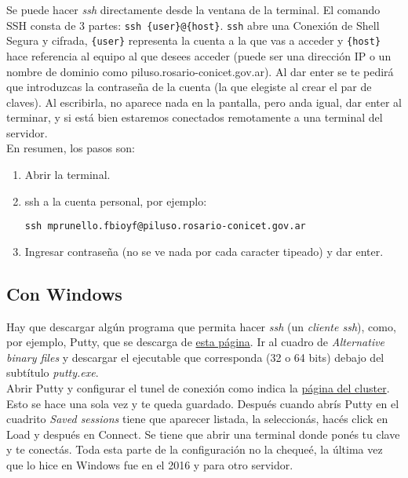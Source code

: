 \documentclass[paper=a4, fontsize=11pt]{scrartcl} %
\numberwithin{equation}{section} %
\numberwithin{figure}{section} %
\numberwithin{table}{section} %
\begin{document}
Se puede hacer \textit{ssh} directamente desde la ventana de la terminal. El comando SSH consta de 3 partes: \texttt{ssh \{user\}@\{host\}}. \texttt{ssh} abre una Conexión de Shell Segura y cifrada, \texttt{\{user\}} representa la cuenta a la que vas a acceder y \texttt{\{host\}} hace referencia al equipo al que desees acceder (puede ser una dirección IP o un nombre de dominio como piluso.rosario-conicet.gov.ar). Al dar enter se te pedirá que introduzcas la contraseña de la cuenta (la que elegiste al crear el par de claves). Al escribirla, no aparece nada en la pantalla, pero anda igual, dar enter al terminar, y si está bien estaremos conectados remotamente a una terminal del servidor.\\

En resumen, los pasos son:

\begin{enumerate}
	\item Abrir la terminal.
	\item ssh a la cuenta personal, por ejemplo:
	
	\texttt{ssh mprunello.fbioyf@piluso.rosario-conicet.gov.ar}
	
	\item Ingresar contraseña (no se ve nada por cada caracter tipeado) y dar enter.
\end{enumerate}

\subsection{Con Windows}

Hay que descargar algún programa que permita hacer \textit{ssh} (un \textit{cliente ssh}), como, por ejemplo, Putty, que se descarga de \href{https://www.chiark.greenend.org.uk/~sgtatham/putty/latest.html}{esta página}. Ir al cuadro de \textit{Alternative binary files} y descargar el ejecutable que corresponda (32 o 64 bits) debajo del subtítulo \textit{putty.exe}.\\

Abrir Putty y configurar el tunel de conexión como indica la \href{http://cluster.rosario-conicet.gov.ar/cluster_utilizacion.php}{página del cluster}. Esto se hace una sola vez y te queda guardado. Después cuando abrís Putty en el cuadrito \textit{Saved sessions} tiene que aparecer listada, la seleccionás, hacés click en Load y después en Connect. Se tiene que abrir una terminal donde ponés tu clave y te conectás. Toda esta parte de la configuración no la chequeé, la última vez que lo hice en Windows fue en el 2016 y para otro servidor.
\end{document}
